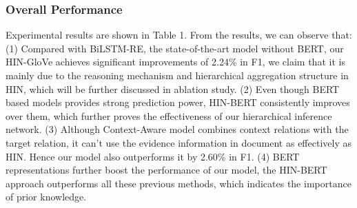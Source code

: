 \documentclass[runningheads]{llncs}
\begin{document}
\subsubsection{Overall Performance}
Experimental results are shown in Table 1. From the results, we can observe that:
(1) Compared with BiLSTM-RE, the state-of-the-art model without BERT, our HIN-GloVe achieves significant improvements of 2.24\% in F1, we claim that it is mainly due to the reasoning mechanism and hierarchical aggregation structure in HIN, which will be further discussed in ablation study.
(2) Even though BERT based models provides strong prediction power, HIN-BERT consistently improves over them,
which further proves the effectiveness of our hierarchical inference network.
(3) Although Context-Aware model combines context relations with the target relation, it can't use the evidence information in document as effectively as HIN. Hence our model also outperforms it by 2.60\% in F1.
(4) BERT representations further boost the performance of our model, the HIN-BERT approach outperforms all these previous methods, which indicates the importance of prior knowledge.

\begin{table}[t]
	\small
	\caption{Results of ablation study (\%).}
	\centering
	\label{tab4}
\end{table}
\end{document}
